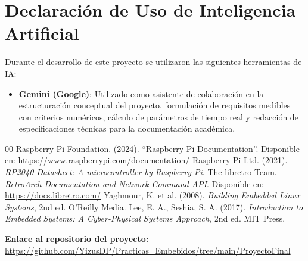 \documentclass[conference]{IEEEtran}
\begin{document}
\section{Declaración de Uso de Inteligencia Artificial}

Durante el desarrollo de este proyecto se utilizaron las siguientes herramientas de IA:
\begin{itemize}
	\item \textbf{Gemini (Google)}: Utilizado como asistente de colaboración en la estructuración conceptual del proyecto, formulación de requisitos medibles con criterios numéricos, cálculo de parámetros de tiempo real y redacción de especificaciones técnicas para la documentación académica.
\end{itemize}

\begin{thebibliography}{00}
	 Raspberry Pi Foundation. (2024). ``Raspberry Pi Documentation''. Disponible en: \url{https://www.raspberrypi.com/documentation/}
	 Raspberry Pi Ltd. (2021). \textit{RP2040 Datasheet: A microcontroller by Raspberry Pi}.
	 The libretro Team. \textit{RetroArch Documentation and Network Command API}. Disponible en: \url{https://docs.libretro.com/}
	 Yaghmour, K. et al. (2008). \textit{Building Embedded Linux Systems}, 2nd ed. O'Reilly Media.
	 Lee, E. A., Seshia, S. A. (2017). \textit{Introduction to Embedded Systems: A Cyber-Physical Systems Approach}, 2nd ed. MIT Press.
\end{thebibliography}

\vspace{0.5cm}

\noindent
\textbf{Enlace al repositorio del proyecto:} \\
\url{https://github.com/YizusDP/Practicas_Embebidos/tree/main/ProyectoFinal}
\end{document}
